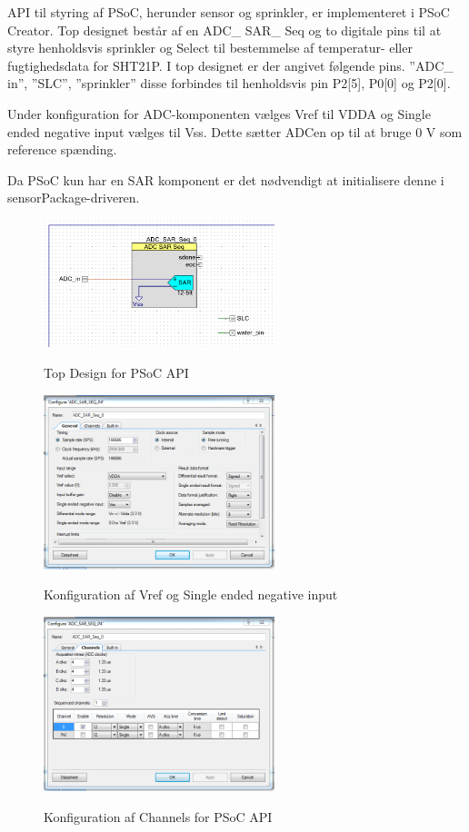 
API til styring af PSoC, herunder sensor og sprinkler, er implementeret i PSoC Creator. Top designet består af en ADC\_ SAR\_ Seq og to digitale pins til at styre henholdsvis sprinkler og Select til bestemmelse af temperatur- eller fugtighedsdata for SHT21P.
I top designet er der angivet følgende pins. ''ADC\_ in'', ''SLC'', ''sprinkler'' disse forbindes til henholdsvis pin P2[5], P0[0] og P2[0]. 

Under konfiguration for ADC-komponenten vælges Vref til VDDA og Single ended negative input vælges til Vss. Dette sætter ADCen op til at bruge 0 V som reference spænding.

Da PSoC kun har en SAR komponent er det nødvendigt at initialisere denne i sensorPackage-driveren.

\begin{figure}[htb]
\centering
{\includegraphics[width=0.60\textwidth]{filer/pics/psoc_api_topdesign.png}}
\caption{Top Design for PSoC API}
\label{lab:sht_filter}
\end{figure}

\begin{figure}[htb]
\centering
{\includegraphics[width=0.60\textwidth]{filer/pics/psoc_api_config1.png}}
\caption{Konfiguration af Vref og Single ended negative input}
\label{lab:sht_filter}
\end{figure}

\begin{figure}[htb]
\centering
{\includegraphics[width=0.60\textwidth]{filer/pics/psoc_api_config2.png}}
\caption{Konfiguration af Channels for PSoC API}
\label{lab:sht_filter}
\end{figure}